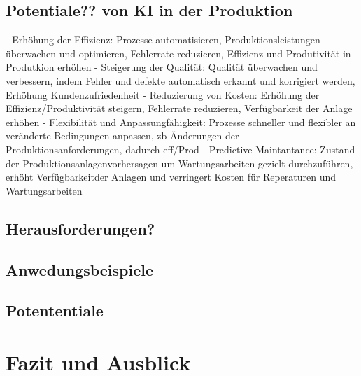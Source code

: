 \documentclass[a4paper,12pt, german]{report}
\begin{document}
\section{Potentiale?? von KI in der Produktion}

- Erhöhung der Effizienz: Prozesse automatisieren, Produktionsleistungen überwachen und optimieren, Fehlerrate reduzieren, Effizienz und Produtivität in Produtkion erhöhen
- Steigerung der Qualität: Qualität überwachen und verbessern, indem Fehler und defekte automatisch erkannt und korrigiert werden, Erhöhung Kundenzufriedenheit
- Reduzierung von Kosten: Erhöhung der Effizienz/Produktivität steigern, Fehlerrate reduzieren, Verfügbarkeit der Anlage erhöhen
- Flexibilität und Anpassungfähigkeit: Prozesse schneller und flexibler an veränderte Bedingungen anpassen, zb Änderungen der Produktionsanforderungen, dadurch eff/Prod
- Predictive Maintantance: Zustand der Produktionsanlagenvorhersagen um Wartungsarbeiten gezielt durchzuführen, erhöht Verfügbarkeitder Anlagen und verringert Kosten für Reperaturen und Wartungsarbeiten

\section{Herausforderungen?}

\section{Anwedungsbeispiele}

\section{Potententiale}

\chapter{Fazit und Ausblick}

\listoffigures

\clearpage




\appendix
\end{document}
